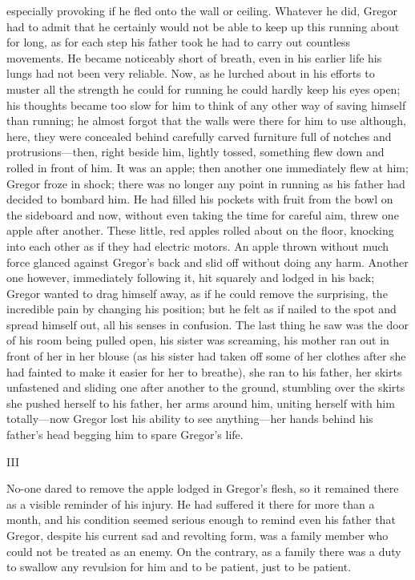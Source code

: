 especially provoking if he fled onto the wall or ceiling. Whatever he
did, Gregor had to admit that he certainly would not be able to keep up
this running about for long, as for each step his father took he had to
carry out countless movements. He became noticeably short of breath,
even in his earlier life his lungs had not been very reliable. Now, as
he lurched about in his efforts to muster all the strength he could for
running he could hardly keep his eyes open; his thoughts became too
slow for him to think of any other way of saving himself than running;
he almost forgot that the walls were there for him to use although,
here, they were concealed behind carefully carved furniture full of
notches and protrusions—then, right beside him, lightly tossed,
something flew down and rolled in front of him. It was an apple; then
another one immediately flew at him; Gregor froze in shock; there was
no longer any point in running as his father had decided to bombard
him. He had filled his pockets with fruit from the bowl on the
sideboard and now, without even taking the time for careful aim, threw
one apple after another. These little, red apples rolled about on the
floor, knocking into each other as if they had electric motors. An
apple thrown without much force glanced against Gregor’s back and slid
off without doing any harm. Another one however, immediately following
it, hit squarely and lodged in his back; Gregor wanted to drag himself
away, as if he could remove the surprising, the incredible pain by
changing his position; but he felt as if nailed to the spot and spread
himself out, all his senses in confusion. The last thing he saw was the
door of his room being pulled open, his sister was screaming, his
mother ran out in front of her in her blouse (as his sister had taken
off some of her clothes after she had fainted to make it easier for her
to breathe), she ran to his father, her skirts unfastened and sliding
one after another to the ground, stumbling over the skirts she pushed
herself to his father, her arms around him, uniting herself with him
totally—now Gregor lost his ability to see anything—her hands behind
his father’s head begging him to spare Gregor’s life.




III


No-one dared to remove the apple lodged in Gregor’s flesh, so it
remained there as a visible reminder of his injury. He had suffered it
there for more than a month, and his condition seemed serious enough to
remind even his father that Gregor, despite his current sad and
revolting form, was a family member who could not be treated as an
enemy. On the contrary, as a family there was a duty to swallow any
revulsion for him and to be patient, just to be patient.

